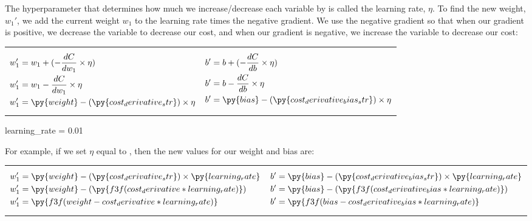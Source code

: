 \documentclass[12pt]{article}
\begin{document}
The hyperparameter that determines how much we increase/decrease each variable by is called the learning rate, $\eta$. To find the new weight, $w_1'$, we add the current weight $w_1$ to the learning rate times the negative gradient. We use the negative gradient so that when our gradient is positive, we decrease the variable to decrease our cost, and when our gradient is negative, we increase the variable to decrease our cost:
{
\setlength{\abovedisplayskip}{0pt}
\setlength{\belowdisplayskip}{0pt}
\begin{center}
	\noindent\begin{tabularx}{0.8\linewidth}{X X}
		\vbox{
			\begin{align*}
				w_1' & = w_1 + (-\frac{dC}{dw_1} \times \eta)
				\\
				w_1' & = w_1 - \frac{dC}{dw_1} \times \eta
				\\
				w_1' & = \py{weight} - (\py{cost_derivative_str}) \times \eta
			\end{align*}
		}
		 &
		\vbox{
			\begin{align*}
				b' & = b + (-\frac{dC}{db} \times \eta)
				\\
				b' & = b - \frac{dC}{db} \times \eta
				\\
				b' & = \py{bias} - (\py{cost_derivative_bias_str}) \times \eta
			\end{align*}
		}
	\end{tabularx}
\end{center}
}

\begin{pycode}
learning_rate = 0.01
\end{pycode}

{
\setlength{\abovedisplayskip}{0pt}
\setlength{\belowdisplayskip}{0pt}
For example, if we set $\eta$ equal to , then the new values for our weight and bias are:
\begin{center}
	\begin{tabularx}{0.8\linewidth}{X X}
		\vbox{
			\begin{align*}
				w_1' & = \py{weight} - (\py{cost_derivative_str}) \times \py{learning_rate}
				\\
				w_1' & = \py{weight} - (\py{f3f(cost_derivative * learning_rate)})
				\\
				w_1' & = \py{f3f(weight - cost_derivative * learning_rate)}
			\end{align*}
		} &
		\vbox{
			\begin{align*}
				b' & = \py{bias} - (\py{cost_derivative_bias_str}) \times \py{learning_rate}
				\\
				b' & = \py{bias} - (\py{f3f(cost_derivative_bias * learning_rate)})
				\\
				b' & = \py{f3f(bias - cost_derivative_bias * learning_rate)}
			\end{align*}
		}
	\end{tabularx}
\end{center}
}
\end{document}
